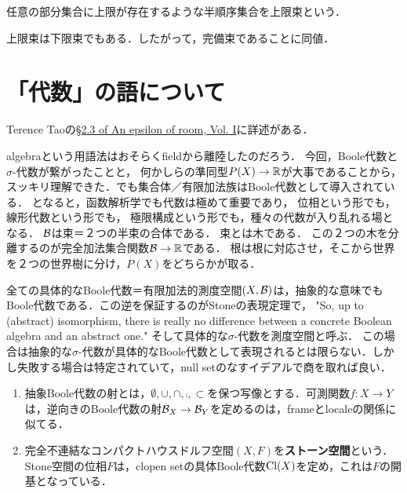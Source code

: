 \documentclass[uplatex, dvipdfmx]{jsreport}
\begin{document}
\begin{definition}[suplattice]
    任意の部分集合に上限が存在するような半順序集合を上限束という．
\end{definition}

\begin{lemma}
    上限束は下限束でもある．したがって，完備束であることに同値．
\end{lemma}

\section{「代数」の語について}

\begin{tcolorbox}[colframe=ForestGreen, colback=ForestGreen!10!white,breakable,colbacktitle=ForestGreen!40!white,coltitle=black,fonttitle=\bfseries\sffamily,
title=]
    Terence Taoの\href{https://terrytao.files.wordpress.com/2010/02/epsilon.pdf}{§2.3 of An epsilon of room, Vol. I}に詳述がある．
\end{tcolorbox}

\begin{discussion}[algebra]
    algebraという用語法はおそらくfieldから離陸したのだろう．
    今回，Boole代数と$\sigma$-代数が繋がったことと，
    何かしらの準同型$P(X)\to\mathbb{R}$が大事であることから，
    スッキリ理解できた．\cite{Tao}でも集合体／有限加法族はBoole代数として導入されている．
    となると，函数解析学でも代数は極めて重要であり，
    位相という形でも，線形代数という形でも，
    極限構成という形でも，種々の代数が入り乱れる場となる．
    $\mathcal{B}$は束＝２つの半束の合体である．
    束とは木である．
    この２つの木を分離するのが完全加法集合関数$\mathcal{B}\to\mathbb{R}$である．
    根は根に対応させ，そこから世界を２つの世界樹に分け，$P(X)$をどちらかが取る．
\end{discussion}

\begin{discussion}
    全ての具体的なBoole代数＝有限加法的測度空間$(X,\mathcal{B})$は，抽象的な意味でもBoole代数である．この逆を保証するのがStoneの表現定理で，
    "So, up to (abstract) isomorphism, there is really no difference between a concrete Boolean algebra and an abstract one."\cite{Tao}
    そして具体的な$\sigma$-代数を測度空間と呼ぶ．
    この場合は抽象的な$\sigma$-代数が具体的なBoole代数として表現されるとは限らない．しかし失敗する場合は特定されていて，null setのなすイデアルで商を取れば良い．
\end{discussion}

\begin{definition}\mbox{}
    \begin{enumerate}
        \item 抽象Boole代数の射とは，$\emptyset,\cup,\cap,\comp,\subset$を保つ写像とする．可測関数$f:X\to Y$は，逆向きのBoole代数の射$\mathcal{B}_X\to\mathcal{B}_Y$を定めるのは，frameとlocaleの関係に似てる．
        \item 完全不連結なコンパクトハウスドルフ空間$(X,F)$を\textbf{ストーン空間}という．Stone空間の位相$F$は，clopen setの具体Boole代数$\mathrm{Cl}(X)$を定め，これは$F$の開基となっている．
    \end{enumerate}
\end{definition}
\end{document}
